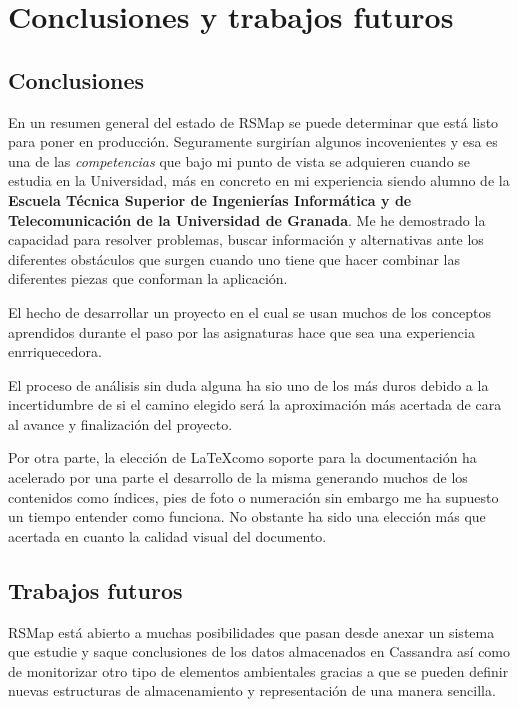 \chapter{Conclusiones y trabajos futuros}

\section{Conclusiones}
En un resumen general del estado de RSMap se puede determinar que está listo para poner en producción. Seguramente surgirían algunos incovenientes y esa es una de las \textit{competencias} que bajo mi punto de vista se adquieren cuando se estudia en la Universidad, más en concreto en mi experiencia siendo alumno de la \textbf{Escuela Técnica Superior de Ingenierías Informática y de Telecomunicación de la Universidad de Granada}. Me he demostrado la capacidad para resolver problemas, buscar información y alternativas ante los diferentes obstáculos que surgen cuando uno tiene que hacer combinar las diferentes piezas que conforman la aplicación.

El hecho de desarrollar un proyecto en el cual se usan muchos de los conceptos aprendidos durante el paso por las asignaturas hace que sea una experiencia enrriquecedora.

\bigskip

El proceso de análisis sin duda alguna ha sio uno de los más duros debido a la incertidumbre de si el camino elegido será la aproximación más acertada de cara al avance y finalización del proyecto.

Por otra parte, la elección de \LaTeX como soporte para la documentación ha acelerado por una parte el desarrollo de la misma generando muchos de los contenidos como índices, pies de foto o numeración sin embargo me ha supuesto un tiempo entender como funciona. No obstante ha sido una elección más que acertada en cuanto la calidad visual del documento.

\newpage

\section{Trabajos futuros}

RSMap está abierto a muchas posibilidades que pasan desde anexar un sistema que estudie y saque conclusiones de los datos almacenados en Cassandra así como de monitorizar otro tipo de elementos ambientales gracias a que se pueden definir nuevas estructuras de almacenamiento y representación de una manera sencilla.

